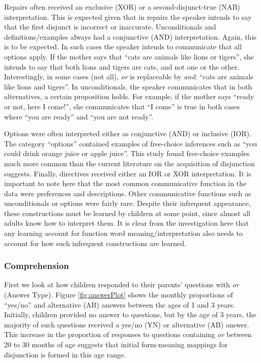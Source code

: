 \documentclass[,man,floatsintext]{apa6}
\begin{document}
Repairs often received an exclusive (XOR) or a second-disjunct-true (NAB) interpretation. This is expected given that in repairs the speaker intends to say that the first disjunct is incorrect or inaccurate. Unconditionals and definitions/examples always had a conjunctive (AND) interpretation. Again, this is to be expected. In such cases the speaker intends to communicate that all options apply. If the mother says that \enquote{cats are animals like lions or tigers}, she intends to say that both lions and tigers are cats, and not one or the other. Interestingly, in some cases (not all), \emph{or} is replaceable by \emph{and}: \enquote{cats are animals like lions and tigers}. In unconditionals, the speaker communicates that in both alternatives, a certain proposition holds. For example, if the mother says \enquote{ready or not, here I come!}, she communicates that \enquote{I come} is true in both cases where \enquote{you are ready} and \enquote{you are not ready}.

Options were often interpreted either as conjunctive (AND) or inclusive (IOR). The category \enquote{options} contained examples of free-choice inferences such as \enquote{you could drink orange juice or apple juice}. This study found free-choice examples much more common than the current literature on the acquisition of disjunction suggests. Finally, directives received either an IOR or XOR interpretation. It is important to note here that the most common communicative function in the data were preferences and descriptions. Other communicative functions such as unconditionals or options were fairly rare. Despite their infrequent appearance, these constructions must be learned by children at some point, since almost all adults know how to interpret them. It is clear from the investigation here that any learning account for function word meaning/interpretation also needs to account for how such infrequent constructions are learned.

\hypertarget{comprehension}{%
\subsubsection{Comprehension}\label{comprehension}}

First we look at how children responded to their parents' questions with \emph{or} (Answer Type). Figure \ref{fig:answerPlot} shows the monthly proportions of \enquote{yes/no} and alternative (AB) answers between the ages of 1 and 3 years. Initially, children provided no answer to questions, but by the age of 3 years, the majority of such questions received a yes/no (YN) or alternative (AB) answer. This increase in the proportion of responses to questions containing \emph{or} between 20 to 30 months of age suggests that initial form-meaning mappings for disjunction is formed in this age range.
\end{document}
